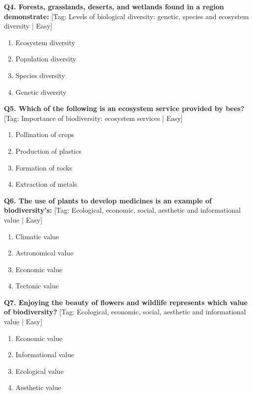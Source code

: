 \noindent\textbf{Q4. Forests, grasslands, deserts, and wetlands found in a region demonstrate:} \hfill [Tag: Levels of biological diversity: genetic, species and ecosystem diversity | Easy]
\begin{enumerate}[label=(\alph*),topsep=2pt,itemsep=1pt,partopsep=0pt,parsep=0pt]
    \item {Ecosystem diversity}
    \item {Population diversity}
    \item {Species diversity}
    \item {Genetic diversity}
\end{enumerate}
\vspace{2mm}

\noindent\textbf{Q5. Which of the following is an ecosystem service provided by bees?} \hfill [Tag: Importance of biodiversity: ecosystem services | Easy]
\begin{enumerate}[label=(\alph*),topsep=2pt,itemsep=1pt,partopsep=0pt,parsep=0pt]
    \item {Pollination of crops}
    \item {Production of plastics}
    \item {Formation of rocks}
    \item {Extraction of metals}
\end{enumerate}
\vspace{2mm}

\noindent\textbf{Q6. The use of plants to develop medicines is an example of biodiversity's:} \hfill [Tag: Ecological, economic, social, aesthetic and informational value | Easy]
\begin{enumerate}[label=(\alph*),topsep=2pt,itemsep=1pt,partopsep=0pt,parsep=0pt]
    \item {Climatic value}
    \item {Astronomical value}
    \item {Economic value}
    \item {Tectonic value}
\end{enumerate}
\vspace{2mm}

\noindent\textbf{Q7. Enjoying the beauty of flowers and wildlife represents which value of biodiversity?} \hfill [Tag: Ecological, economic, social, aesthetic and informational value | Easy]
\begin{enumerate}[label=(\alph*),topsep=2pt,itemsep=1pt,partopsep=0pt,parsep=0pt]
    \item {Economic value}
    \item {Informational value}
    \item {Ecological value}
    \item {Aesthetic value}
\end{enumerate}
\vspace{2mm}

